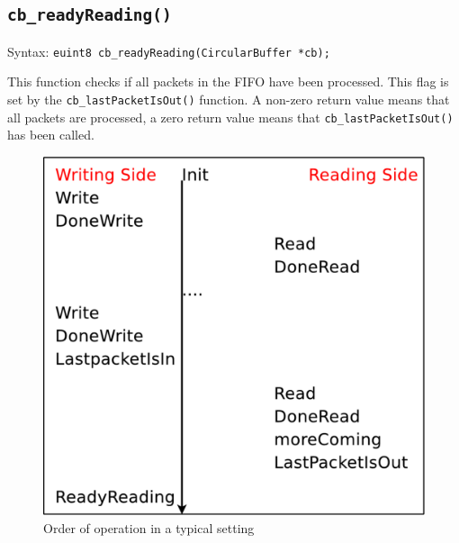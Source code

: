 \documentclass[a4paper]{article}
\begin{document}
\subsection*{\texttt{cb\_readyReading()}}
Syntax: \lstinline!euint8 cb_readyReading(CircularBuffer *cb);!

This function checks if all packets in the FIFO have been processed. This flag is set by the \texttt{cb\_lastPacketIsOut()} function.
A non-zero return value means that all packets are processed, a zero return value means that \texttt{cb\_lastPacketIsOut()} has been called.

\begin{figure}[bth]
	\centering
	\includegraphics[width=.4\textwidth]{diagrams/order.pdf}
	\caption{Order of operation in a typical setting}
\end{figure}

% 
% 
\end{document}

